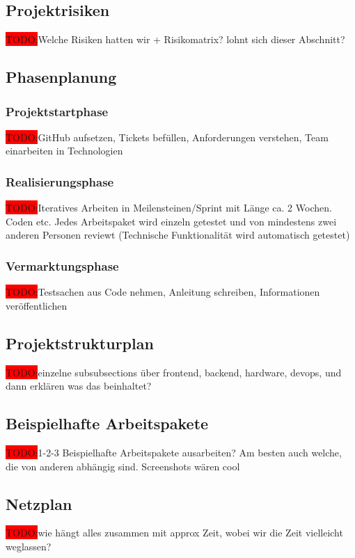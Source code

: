 \documentclass[10pt, a4paper, draft]{article}
\begin{document}
\subsection{Projektrisiken}
\colorbox{red}{TODO:}Welche Risiken hatten wir + Risikomatrix? lohnt sich dieser Abschnitt?

\subsection{Phasenplanung}
\subsubsection{Projektstartphase}
\colorbox{red}{TODO:}GitHub aufsetzen, Tickets befüllen, Anforderungen verstehen, Team einarbeiten in Technologien
\subsubsection{Realisierungsphase}
\colorbox{red}{TODO:}Iteratives Arbeiten in Meilensteinen/Sprint mit Länge ca. 2 Wochen. Coden etc. Jedes Arbeitspaket wird einzeln getestet und von mindestens zwei anderen Personen reviewt (Technische Funktionalität wird automatisch getestet)

\subsubsection{Vermarktungsphase}
\colorbox{red}{TODO:}Testsachen aus Code nehmen, Anleitung schreiben, Informationen veröffentlichen

\subsection{Projektstrukturplan}
\colorbox{red}{TODO:}einzelne subsubsections über frontend, backend, hardware, devops, und dann erklären was das beinhaltet?

\subsection{Beispielhafte Arbeitspakete}
\colorbox{red}{TODO:}1-2-3 Beispielhafte Arbeitspakete ausarbeiten? Am besten auch welche, die von anderen abhängig sind. Screenshots wären cool

\subsection{Netzplan}
\colorbox{red}{TODO:}wie hängt alles zusammen mit approx Zeit, wobei wir die Zeit vielleicht weglassen?
\end{document}
